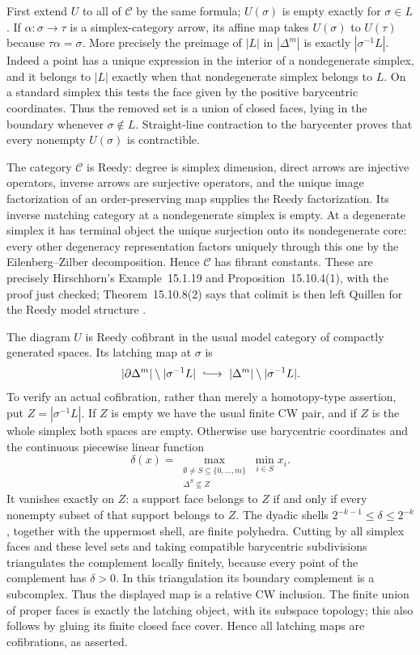 First extend $U$ to all of $\mathcal C$ by the same formula;
$U(\sigma)$ is empty exactly for $\sigma\in L$.  If
$\alpha:\sigma\to\tau$ is a simplex-category arrow, its affine
map takes $U(\sigma)$ to $U(\tau)$ because
$\tau\alpha=\sigma$.  More precisely the preimage of $|L|$ in
$|\Delta^m|$ is exactly $|\sigma^{-1}L|$.  Indeed a point has a
unique expression in the interior of a nondegenerate simplex, and
it belongs to $|L|$ exactly when that nondegenerate simplex belongs
to $L$.  On a standard simplex this tests the face given by the
positive barycentric coordinates.  Thus the removed set is a union
of closed faces, lying in the boundary whenever $\sigma\notin L$.
Straight-line contraction to the barycenter proves that every
nonempty $U(\sigma)$ is contractible.

The category $\mathcal C$ is Reedy: degree is simplex dimension,
direct arrows are injective operators, inverse arrows are surjective
operators, and the unique image factorization of an order-preserving
map supplies the Reedy factorization.  Its inverse matching category
at a nondegenerate simplex is empty.  At a degenerate simplex it
has terminal object the unique surjection onto its nondegenerate
core: every other degeneracy representation factors uniquely through
this one by the Eilenberg--Zilber decomposition.  Hence $\mathcal C$
has fibrant constants.  These are precisely Hirschhorn's
Example~15.1.19 and Proposition~15.10.4(1), with the proof just
checked; Theorem~15.10.8(2) says that colimit is then left Quillen
for the Reedy model structure \cite{BHirschhorn2003}.

The diagram $U$ is Reedy cofibrant in the usual model category of
compactly generated spaces.  Its latching map at $\sigma$ is
\[
 |\partial\Delta^m|\setminus|\sigma^{-1}L|
    \ \lhook\joinrel\longrightarrow\
 |\Delta^m|\setminus|\sigma^{-1}L|.
\]
To verify an actual cofibration, rather than merely a homotopy-type
assertion, put $Z=|\sigma^{-1}L|$.  If $Z$ is empty we have the
usual finite CW pair, and if $Z$ is the whole simplex both spaces
are empty.  Otherwise use barycentric coordinates and the continuous
piecewise linear function
\[
 \delta(x)=
 \max_{\substack{\emptyset\ne S\subseteq\{0,\ldots,m\}\\
                  \Delta^S\not\subseteq Z}}
       \min_{i\in S}x_i.
\]
It vanishes exactly on $Z$: a support face belongs to $Z$ if and
only if every nonempty subset of that support belongs to $Z$.
The dyadic shells
$2^{-k-1}\leq\delta\leq2^{-k}$, together with the uppermost
shell, are finite polyhedra.  Cutting by all simplex faces and
these level sets and taking compatible barycentric subdivisions
triangulates the complement locally finitely, because every point
of the complement has $\delta>0$.  In this triangulation its
boundary complement is a subcomplex.  Thus the displayed map is
a relative CW inclusion.  The finite union of proper faces is
exactly the latching object, with its subspace topology; this also
follows by gluing its finite closed face cover.  Hence all latching
maps are cofibrations, as asserted.

